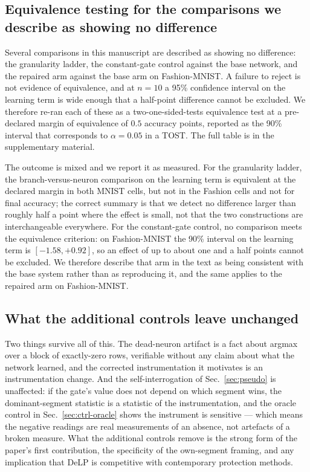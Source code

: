\documentclass[review,12pt,number]{elsarticle}
\begin{document}
\subsection{Equivalence testing for the comparisons we describe as
showing no difference}
\label{sec:ctrl-tost}

Several comparisons in this manuscript are described as showing no
difference: the granularity ladder, the constant-gate control against the
base network, and the repaired arm against the base arm on
Fashion-MNIST. A failure to reject is not evidence of equivalence, and at
$n=10$ a 95\% confidence interval on the learning term is wide enough
that a half-point difference cannot be excluded. We therefore re-ran each
of these as a two-one-sided-tests equivalence test at a pre-declared
margin of equivalence of $0.5$ accuracy points, reported as the 90\%
interval that corresponds to $\alpha=0.05$ in a TOST. The full table is
in the supplementary material.

The outcome is mixed and we report it as measured. For the granularity
ladder, the branch-versus-neuron comparison on the learning term is
equivalent at the declared margin in both MNIST cells, but not in the
Fashion cells and not for final accuracy; the correct summary is that we
detect no difference larger than roughly half a point where the effect
is small, not that the two constructions are interchangeable everywhere.
For the constant-gate control, no comparison meets the equivalence
criterion: on Fashion-MNIST the 90\% interval on the learning term is
$[-1.58,+0.92]$, so an effect of up to about one and a half points cannot
be excluded. We therefore describe that arm in the text as being
consistent with the base system rather than as reproducing it, and the
same applies to the repaired arm on Fashion-MNIST.

\subsection{What the additional controls leave unchanged}
\label{sec:ctrl-unchanged}

Two things survive all of this. The dead-neuron artifact is a fact about
argmax over a block of exactly-zero rows, verifiable without any claim
about what the network learned, and the corrected instrumentation it
motivates is an instrumentation change. And the self-interrogation of
Sec.~\ref{sec:pseudo} is unaffected: if the gate's value does not depend
on which segment wins, the dominant-segment statistic is a statistic of
the instrumentation, and the oracle control in Sec.~\ref{sec:ctrl-oracle}
shows the instrument is sensitive --- which means the negative readings
are real measurements of an absence, not artefacts of a broken measure.
What the additional controls remove is the strong form of the paper's
first contribution, the specificity of the own-segment framing, and any
implication that DeLP is competitive with contemporary protection
methods.
\end{document}
